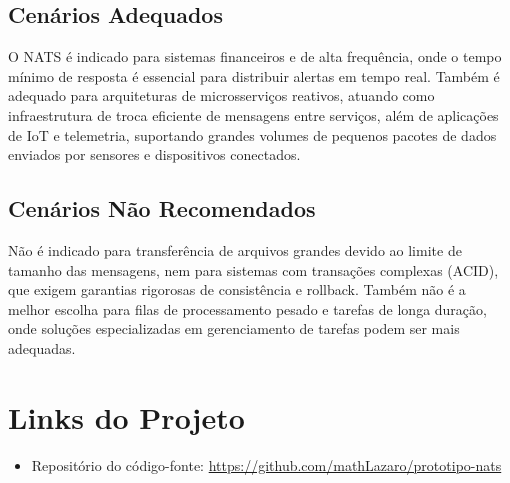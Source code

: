 \subsection{Cenários Adequados}
O NATS é indicado para sistemas financeiros e de alta frequência, onde o tempo mínimo de resposta é essencial para distribuir alertas em tempo real. Também é adequado para arquiteturas de microsserviços reativos, atuando como infraestrutura de troca eficiente de mensagens entre serviços, além de aplicações de IoT e telemetria, suportando grandes volumes de pequenos pacotes de dados enviados por sensores e dispositivos conectados.

\subsection{Cenários Não Recomendados}
Não é indicado para transferência de arquivos grandes devido ao limite de tamanho das mensagens, nem para sistemas com transações complexas (ACID), que exigem garantias rigorosas de consistência e rollback. Também não é a melhor escolha para filas de processamento pesado e tarefas de longa duração, onde soluções especializadas em gerenciamento de tarefas podem ser mais adequadas.


\section{Links do Projeto}

\begin{itemize}
    \item Repositório do código-fonte:
    \url{https://github.com/mathLazaro/prototipo-nats}
\end{itemize}


